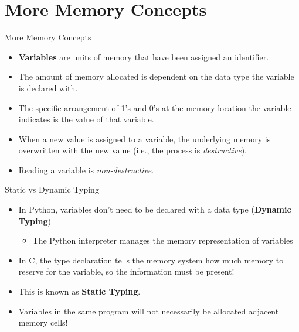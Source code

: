 \documentclass[11pt]{beamer}
\begin{document}
\section[Memory]{More Memory Concepts}
\begin{frame}{More Memory Concepts}
\begin{itemize}
\item \textbf{Variables} are units of memory that have been assigned an identifier.  
\item The amount of memory allocated is dependent on the data type the variable is declared with.
\item The specific arrangement of 1's and 0's at the memory location the variable indicates is the value of that variable.
\item When a new value is assigned to a variable, the underlying memory is overwritten with the new value (i.e., the process is \emph{destructive}).
\item Reading a variable is \emph{non-destructive}.
\end{itemize}
\end{frame}

\begin{frame}{Static vs Dynamic Typing}
\begin{itemize}
\item In Python, variables don't need to be declared with a data type (\textbf{Dynamic Typing})
\begin{itemize}
	\item The Python interpreter manages the memory representation of variables
\end{itemize}
\item In C, the type declaration tells the memory system how much memory to reserve for the variable, so the information must be present! 
\item This is known as \textbf{Static Typing}.
\item Variables in the same program will not necessarily be allocated adjacent memory cells! 
\end{itemize}
\end{frame}
\end{document}
